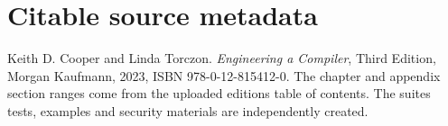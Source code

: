 \documentclass[10pt,letterpaper]{article}
\begin{document}
\section{Citable source metadata}
Keith D. Cooper and Linda Torczon. \emph{Engineering a Compiler}, Third Edition, Morgan Kaufmann, 2023, ISBN 978-0-12-815412-0. The chapter and appendix section ranges come from the uploaded edition\textquotesingle s table of contents. The suite\textquotesingle s tests, examples and security materials are independently created.
\end{document}
